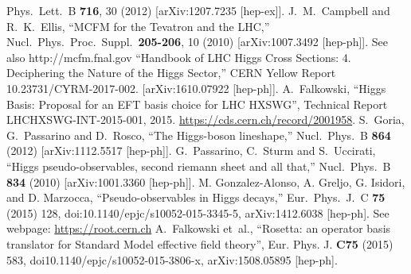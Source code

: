 \documentclass[aps,superscriptaddress,nofootinbib]{revtex4}
\begin{document}
\begin{thebibliography}{99}
  Phys.\ Lett.\ B {\bf 716}, 30 (2012)
  [arXiv:1207.7235 [hep-ex]].
  J.~M.~Campbell and R.~K.~Ellis,
  ``MCFM for the Tevatron and the LHC,''
  Nucl.\ Phys.\ Proc.\ Suppl.\  {\bf 205-206}, 10 (2010)
  [arXiv:1007.3492 [hep-ph]].
  See also http://mcfm.fnal.gov
``Handbook of LHC Higgs Cross Sections: 4. Deciphering the Nature of the Higgs Sector,''
CERN Yellow Report 10.23731/CYRM-2017-002.
[arXiv:1610.07922 [hep-ph]].
{A.~Falkowski, ``{Higgs Basis: Proposal for an EFT basis choice
  for LHC HXSWG}'',} Technical Report LHCHXSWG-INT-2015-001, 2015.
\newblock \url{https://cds.cern.ch/record/2001958}.
  S.~Goria, G.~Passarino and D.~Rosco,
  ``The Higgs-boson lineshape,''
  Nucl.\ Phys.\ B  {\bf 864} (2012)
  [arXiv:1112.5517 [hep-ph]].
  G.~Passarino, C.~Sturm and S.~Uccirati,
  ``Higgs pseudo-observables, second riemann sheet and all that,''
  Nucl.\ Phys.\ B {\bf 834} (2010)
  [arXiv:1001.3360 [hep-ph]].
  M. Gonzalez-Alonso, A. Greljo, G. Isidori, and D. Marzocca, ``Pseudo-observables in
  Higgs decays,'' Eur.\ Phys.\ J.\ C {\bf 75} (2015) 128,
  doi:10.1140/epjc/s10052-015-3345-5, arXiv:1412.6038 [hep-ph].
See webpage: \url{https://root.cern.ch}
A.~Falkowski {et~al.}, ``{Rosetta: an operator basis translator for Standard Model effective field theory}'',
 { Eur. Phys. J.}  {\bf C75} (2015) 583,
 doi{10.1140/epjc/s10052-015-3806-x}, arXiv:1508.05895 [hep-ph].
\end{thebibliography}
\end{document}
